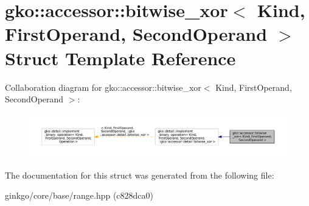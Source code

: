 \hypertarget{structgko_1_1accessor_1_1bitwise__xor}{}\section{gko\+:\+:accessor\+:\+:bitwise\+\_\+xor$<$ Kind, First\+Operand, Second\+Operand $>$ Struct Template Reference}
\label{structgko_1_1accessor_1_1bitwise__xor}


Collaboration diagram for gko\+:\+:accessor\+:\+:bitwise\+\_\+xor$<$ Kind, First\+Operand, Second\+Operand $>$\+:
\nopagebreak
\begin{figure}[H]
\begin{center}
\leavevmode
\includegraphics[width=350pt]{structgko_1_1accessor_1_1bitwise__xor__coll__graph}
\end{center}
\end{figure}


The documentation for this struct was generated from the following file\+:\begin{DoxyCompactItemize}
\item 
ginkgo/core/base/range.\+hpp (c828dca0)\end{DoxyCompactItemize}
